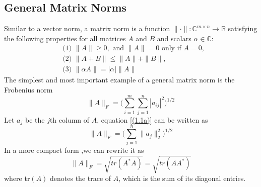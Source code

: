 \subsection{General Matrix Norms}
Similar to a vector norm, a matrix norm is a function  $ \| \cdot \| : \mathbb{C}^{m\times n} \rightarrow \mathbb{R} $ satisfying the following properties for all matrices $A$ and $B$ and scalars $\alpha \in \mathbb{C}$:
\begin{align*}
	&\text{(1) } \| A \| \geq 0, \text{ and } \| A \| = 0 \text{ only if } A = 0,\\
	&\text{(2) } \| A+B \| \leq \| A \| + \| B \|,\\
	&\text{(3) } \| \alpha A \| = |\alpha| \| A \|
\end{align*}
The simplest and most important example of a general matrix norm is the Frobenius norm
\begin{equation}\label{(1.1a)}
	\| A \|_F = \bigg( \sum_{i=1}^{m} \sum_{j=1}^{n} |a_{ij}|^2 \bigg)^{1/2}
\end{equation}
Let $a_j$ be the $j$th column of $A$, equation \ref{(1.1a)} can be written as
\begin{equation}
	\| A \|_F = \bigg(\sum_{j=1}^{n} \|a_{j}\|_2 ^2 \bigg)^{1/2}
\end{equation}
In a more compact form ,we can rewrite it as
\begin{equation}
	\| A \|_F = \sqrt{tr(A^*A)} = \sqrt{tr(AA^*)}
\end{equation}
where tr$(A)$ denotes the trace of $A$, which is the sum of its diagonal entries.


